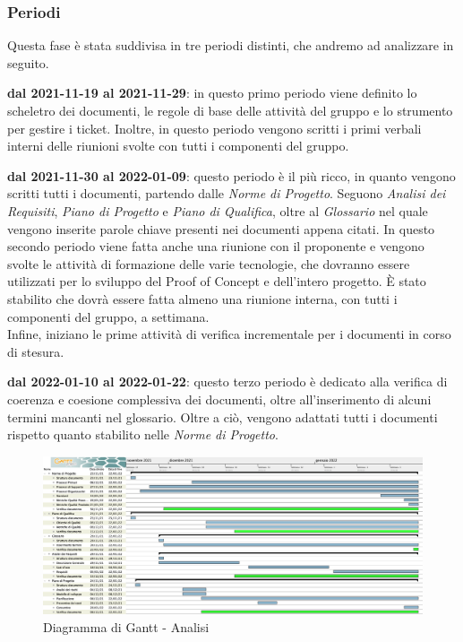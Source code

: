 \subsubsection{Periodi}

Questa fase è stata suddivisa in tre periodi distinti, che andremo ad analizzare in seguito.


\textbf{dal 2021-11-19 al 2021-11-29}: in questo primo periodo viene definito lo scheletro dei documenti, le regole di base delle attività del gruppo e lo strumento per gestire i ticket\glo{}. Inoltre, in questo periodo vengono scritti i primi verbali interni delle riunioni svolte con tutti i componenti del gruppo.


\textbf{dal 2021-11-30 al 2022-01-09}: questo periodo è il più ricco, in quanto vengono scritti tutti i documenti, partendo dalle \textit{Norme di Progetto}. Seguono \textit{Analisi dei Requisiti}, \textit{Piano di Progetto} e \textit{Piano di Qualifica}, oltre al \textit{Glossario} nel quale vengono inserite parole chiave presenti nei documenti appena citati. In questo secondo periodo viene fatta anche una riunione con il proponente e vengono svolte le attività di formazione delle varie tecnologie, che dovranno essere utilizzati per lo sviluppo del Proof of Concept e dell’intero progetto. È stato stabilito che dovrà essere fatta almeno una riunione interna, con tutti i componenti del gruppo, a settimana. \\
Infine, iniziano le prime attività di verifica incrementale per i documenti in corso di stesura. 


\textbf{dal 2022-01-10 al 2022-01-22}: questo terzo periodo è dedicato alla verifica di coerenza e coesione complessiva dei documenti, oltre all’inserimento di alcuni termini mancanti nel glossario. Oltre a ciò, vengono adattati tutti i documenti rispetto quanto stabilito nelle \textit{Norme di Progetto}.

\begin{figure}[H]
\centering
\includegraphics[scale=0.265]{Sezioni/gantt/Analisi.png}
\caption{Diagramma di Gantt\glo{} - Analisi}
\end{figure}
